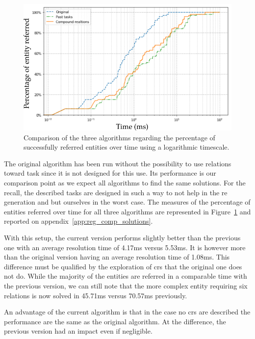 \begin{figure}[ht!]
\centering
\includegraphics[scale=0.5]{figures/chapter7/comparison.png}
\caption{\label{fig:chap7_compare} Comparison of the three algorithms regarding the percentage of successfully referred entities over time using a logarithmic timescale. }
\end{figure}

The original algorithm has been run without the possibility to use relations toward task since it is not designed for this use. Its performance is our comparison point as we expect all algorithms to find the same solutions. For the recall, the described tasks are designed in such a way to not help in the \acrshort{re} generation and but ourselves in the worst case. The measures of the percentage of entities referred over time for all three algorithms are represented in Figure~\ref{fig:chap7_compare} and reported on appendix~\ref{app:reg_comp_solutions}.

With this setup, the current version performs slightly better than the previous one with an average resolution time of 4.17ms versus 5.53ms. It is however more than the original version having an average resolution time of 1.08ms. This difference must be qualified by the exploration of \acrshort{cr}s that the original one does not do. While the majority of the entities are referred in a comparable time with the previous version, we can still note that the more complex entity requiring six relations is now solved in 45.71ms versus 70.57ms previously.

An advantage of the current algorithm is that in the case no \acrshort{cr}s are described the performance are the same as the original algorithm. At the difference, the previous version had an impact even if negligible. 



